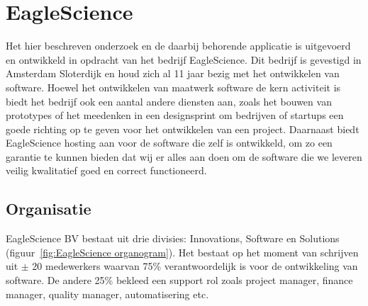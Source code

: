\chapter{EagleScience}\label{ch:EagleScience} %

Het hier beschreven onderzoek en de daarbij behorende applicatie is uitgevoerd en ontwikkeld in opdracht van het bedrijf EagleScience. Dit bedrijf is gevestigd in Amsterdam Sloterdijk en houd zich al 11 jaar bezig met het ontwikkelen van software. Hoewel het ontwikkelen van maatwerk software de kern activiteit is biedt het bedrijf ook een aantal andere diensten aan, zoals het bouwen van prototypes of het meedenken in een designsprint om bedrijven of startups een goede richting op te geven voor het ontwikkelen van een project. Daarnaast biedt EagleScience hosting aan voor de software die zelf is ontwikkeld, om zo een garantie te kunnen bieden dat wij er alles aan doen om de software die we leveren veilig kwalitatief goed en correct functioneerd.

\section{Organisatie}\label{sec:organisatie}
EagleScience BV bestaat uit drie divisies: Innovations, Software en Solutions (figuur~\ref{fig:EagleScience organogram}). Het bestaat op het moment van schrijven uit $\pm$ 20 medewerkers waarvan 75\% verantwoordelijk is voor de ontwikkeling van software. De andere 25\% bekleed een support rol zoals project manager, finance manager, quality manager, automatisering etc.

